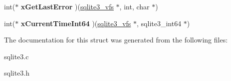 \begin{DoxyCompactItemize}
\item 
\hypertarget{structsqlite3__vfs_a4994110c79d082f7770ce553d507748f}{int($\ast$ {\bfseries x\-Get\-Last\-Error} )(\hyperlink{structsqlite3__vfs}{sqlite3\-\_\-vfs} $\ast$, int, char $\ast$)}\label{structsqlite3__vfs_a4994110c79d082f7770ce553d507748f}

\item 
\hypertarget{structsqlite3__vfs_aa281584c422969b7f0df0e5f918fc590}{int($\ast$ {\bfseries x\-Current\-Time\-Int64} )(\hyperlink{structsqlite3__vfs}{sqlite3\-\_\-vfs} $\ast$, sqlite3\-\_\-int64 $\ast$)}\label{structsqlite3__vfs_aa281584c422969b7f0df0e5f918fc590}

\end{DoxyCompactItemize}


The documentation for this struct was generated from the following files\-:\begin{DoxyCompactItemize}
\item 
sqlite3.\-c\item 
sqlite3.\-h\end{DoxyCompactItemize}
